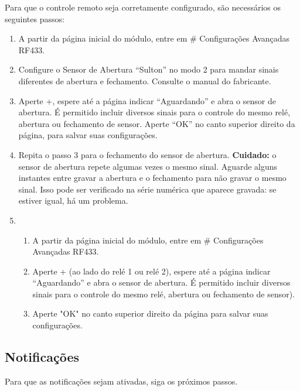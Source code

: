 Para que o controle remoto seja corretamente configurado, são necessários os seguintes passos:
\begin{enumerate}
    \item
    A partir da página inicial do módulo, entre em \# \textrightarrow{} Configurações Avançadas \textrightarrow{} RF433.

    \item
    Configure o Sensor de Abertura “Sulton” no modo 2 para mandar sinais diferentes de abertura e fechamento. Consulte o manual do fabricante.

    \item
    Aperte +, espere até a página indicar “Aguardando” e abra o sensor de abertura. É permitido incluir diversos sinais para o controle do mesmo relé, abertura ou fechamento de sensor. Aperte “OK” no canto superior direito da página, para salvar suas configurações.

    \item
    Repita o passo 3 para o fechamento do sensor de abertura. \textbf{Cuidado:} o sensor de abertura repete algumas vezes o mesmo sinal. Aguarde alguns instantes entre gravar a abertura e o fechamento para não gravar o mesmo sinal. Isso pode ser verificado na série numérica que aparece gravada: se estiver igual, há um problema.

    \item
        \begin{enumerate}
            \item
            A partir da página inicial do módulo, entre em \# \textrightarrow{} Configurações Avançadas \textrightarrow{} RF433.

            \item
            Aperte + (ao lado do relé 1 ou relé 2), espere até a página indicar “Aguardando” e abra o sensor de abertura. É permitido incluir diversos sinais para o controle do mesmo relé, abertura ou fechamento de sensor).

            \item
            Aperte "OK" no canto superior direito da página para salvar suas configurações.

        \end{enumerate}
\end{enumerate}

\subsection{Notificações}
Para que as notificações sejam ativadas, siga os próximos passos.

